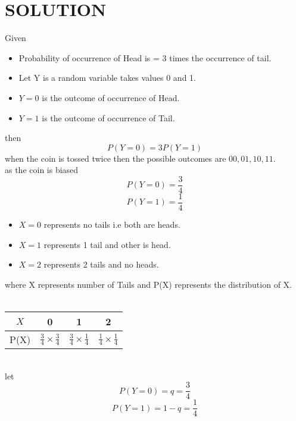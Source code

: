 \documentclass[journal,12pt,twocolumn]{IEEEtran}
\begin{document}
\section{SOLUTION}
Given 
\begin{itemize}
    \item Probability of occurrence of Head is = 3 times the occurrence of tail.
    \item Let Y is a random variable takes values 0 and 1.
    \item $Y=0$ is the outcome of occurrence of Head.
    \item $Y=1$ is the outcome of occurrence of Tail.
\end{itemize}
then
\begin{equation}
    P(Y=0)=3 P(Y=1)
\end{equation}
when the coin is tossed twice then the possible outcomes are   $00,01,10,11$.\\
as the coin is biased 
\begin{equation}
    P(Y=0)=\frac{3}{4} 
\end{equation}
\begin{equation}
    P(Y=1)=\frac{1}{4}
\end{equation}
\begin{itemize}
    \item $X=0$ represents no tails i.e both are heads.
    \item $X=1$ represents 1 tail and other is head.
    \item $X=2$ represents 2 tails and no heads.
    
\end{itemize}
where X represents number of Tails and P(X) represents the distribution of  X.\\ \\
\begin{tabular}{|c|c|c|c|}
\hline
   $X$  & 0 & 1 & 2 \\
\hline
  P(X) & $\frac{3}{4}\times \frac{3}{4}$ &$\frac{3}{4}\times \frac{1}{4}$ & $ \frac{1}{4}\times \frac{1}{4}$ \\
  \hline
\end{tabular}\\
\newline
let 
\begin{equation}
    P(Y=0)=q=\frac{3}{4}
\end{equation}
\begin{equation}
     P(Y=1)=1-q=\frac{1}{4}
\end{equation}
   
\end{document}
